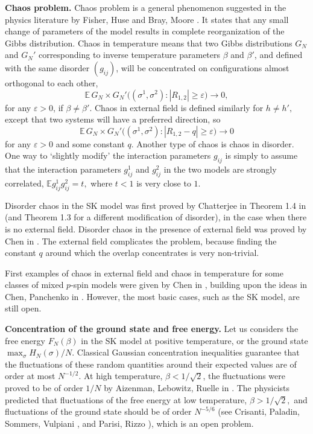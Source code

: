\documentclass[12pt]{article}
\newcommand{\eps}{{\varepsilon}}
\newcommand{\e}{\mathbb{E}}
\theoremstyle{nonumberplain}
\begin{document}
\medskip
\noindent
\textbf{Chaos problem.} Chaos problem is a general phenomenon suggested in the physics literature by Fisher, Huse \cite{FH86} and Bray, Moore \cite{BM87}. It states that any small change of parameters of the model results in complete reorganization of the Gibbs distribution. Chaos in temperature means that two Gibbs distributions $G_N$ and $G_N'$ corresponding to inverse temperature parameters $\beta$ and  $\beta'$, and defined with the same disorder $(g_{ij})$, will be concentrated on configurations almost orthogonal to each other,
$$
\e\, G_N\times G_N' \bigl((\sigma^1,\sigma^2) : |R_{1,2}| \geq \eps \bigr) \to 0,
$$ 
for any $\eps>0$, if $\beta \not = \beta'$. Chaos in external field is defined similarly for $h \not = h',$  except that two systems will have a preferred direction, so 
$$
\e\, G_N\times G_N' \bigl((\sigma^1,\sigma^2) : |R_{1,2} - q| \geq \eps \bigr) \to 0
$$ 
for any $\eps>0$ and some constant $q.$ Another type of chaos is chaos in disorder. One way to `slightly modify' the interaction parameters $g_{ij}$ is simply to assume that the interaction parameters $g_{ij}^1$ and $g_{ij}^2$ in the two models are strongly correlated, $\e g_{ij}^1 g_{ij}^2 = t,$ where $t<1$ is very close to $1$.  

Disorder chaos in the SK model was first proved by Chatterjee in Theorem 1.4 in \cite{Chatt09} (and Theorem 1.3 for a different modification of disorder), in the case when there is no external field. Disorder chaos in the presence of external field was proved by Chen in \cite{ChenChaos0}. The external field complicates the problem, because finding the constant $q$ around which the overlap concentrates is very non-trivial. 

First examples of chaos in external field and chaos in temperature for some classes of mixed $p$-spin models were given by Chen in \cite{ChenChaos}, building upon the ideas in Chen, Panchenko in \cite{ChenChaos2}. However, the most basic cases, such as the SK model, are still open.



\medskip
\noindent
\textbf{Concentration of the ground state and free energy.} Let us considers the free energy $F_N(\beta)$ in the SK model at positive temperature, or the ground state $\max_\sigma H_N(\sigma)/N$. Classical Gaussian concentration inequalities guarantee that the fluctuations of these random quantities around their expected values are of order at most $N^{-1/2}$. At high temperature, $\beta < 1/\sqrt{2}$, the fluctuations were proved to be of order $1/N$ by Aizenman, Lebowitz, Ruelle in \cite{ALR}. The physicists  predicted that fluctuations of the free energy at low temperature, $\beta>1/\sqrt{2},$ and fluctuations of the ground state should be of order $N^{-5/6}$ (see Crisanti, Paladin, Sommers, Vulpiani \cite{CPSV},  and Parisi, Rizzo \cite{ParRiz}), which is an open problem.
\end{document}
